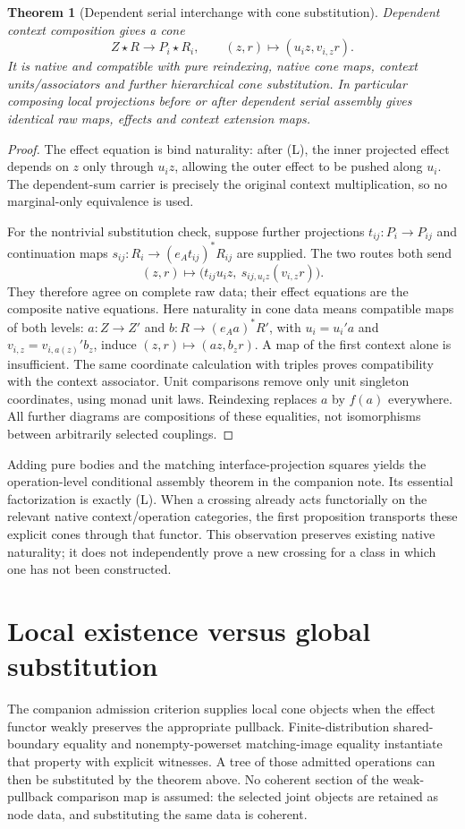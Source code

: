 \documentclass[11pt]{article}
\newtheorem{theorem}{Theorem}\newtheorem{proposition}{Proposition}
\begin{document}
\begin{theorem}[Dependent serial interchange with cone substitution]
Dependent context composition gives a cone
\[
 Z\star R\longrightarrow P_i\star R_i,
 \qquad(z,r)\longmapsto(u_i z,v_{i,z}r).
\tag{A}
\]
It is native and compatible with pure reindexing, native cone maps, context units/associators and further hierarchical cone substitution. In particular composing local projections before or after dependent serial assembly gives identical raw maps, effects and context extension maps.
\end{theorem}
\begin{proof}
The effect equation is bind naturality: after (L), the inner projected effect depends on $z$ only through $u_i z$, allowing the outer effect to be pushed along $u_i$. The dependent-sum carrier is precisely the original context multiplication, so no marginal-only equivalence is used.

For the nontrivial substitution check, suppose further projections $t_{ij}:P_i\to P_{ij}$ and continuation maps $s_{ij}:R_i\to(e_At_{ij})^*R_{ij}$ are supplied. The two routes both send
\[
 (z,r)\longmapsto
 \bigl(t_{ij}u_i z,\ s_{ij,u_i z}(v_{i,z}r)\bigr).
\]
They therefore agree on complete raw data; their effect equations are the composite native equations. Here naturality in cone data means compatible maps of both levels: $a:Z\to Z\prime$ and $b:R\to(e_Aa)^*R\prime$, with $u_i=u_i\prime a$ and $v_{i,z}=v_{i,a(z)}\prime b_z$, induce $(z,r)\mapsto(az,b_zr)$. A map of the first context alone is insufficient. The same coordinate calculation with triples proves compatibility with the context associator. Unit comparisons remove only unit singleton coordinates, using monad unit laws. Reindexing replaces $a$ by $f(a)$ everywhere. All further diagrams are compositions of these equalities, not isomorphisms between arbitrarily selected couplings.
\end{proof}

Adding pure bodies and the matching interface-projection squares yields the operation-level conditional assembly theorem in the companion note. Its essential factorization is exactly (L). When a crossing already acts functorially on the relevant native context/operation categories, the first proposition transports these explicit cones through that functor. This observation preserves existing native naturality; it does not independently prove a new crossing for a class in which one has not been constructed.

\section{Local existence versus global substitution}
The companion admission criterion supplies local cone objects when the effect functor weakly preserves the appropriate pullback. Finite-distribution shared-boundary equality and nonempty-powerset matching-image equality instantiate that property with explicit witnesses. A tree of those admitted operations can then be substituted by the theorem above. No coherent section of the weak-pullback comparison map is assumed: the selected joint objects are retained as node data, and substituting the same data is coherent.
\end{document}
